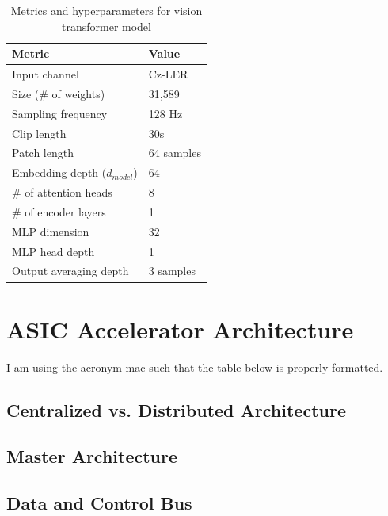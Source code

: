 \documentclass[12pt, hidelinks]{article}
\begin{document}
\begin{table}[ht]
    \centering
    \renewcommand{\arraystretch}{1.2} %
    \setlength{\arrayrulewidth}{1.5pt} %
    \caption{Metrics and hyperparameters for vision transformer model}
    \begin{tabularx}{0.7\textwidth}{@{} *1X *1l @{}}
        \toprule
        Metric                          & Value \\\midrule
        Input channel                   & Cz-LER        \\
        Size (\# of weights)            & 31,589        \\
        Sampling frequency              & 128 Hz        \\
        Clip length                     & 30s           \\
        Patch length                    & 64 samples    \\
        Embedding depth ($d_{model}$)   & 64            \\
        \# of attention heads           & 8             \\
        \# of encoder layers            & 1             \\
        MLP dimension                   & 32            \\
        MLP head depth                  & 1             \\
        Output averaging depth          & 3 samples     \\ \bottomrule 
    \end{tabularx}
    \label{tab:model_param}
\end{table}

\section{ASIC Accelerator Architecture}
\label{sec:arch}
I am using the acronym \ac{mac} such that the table below is properly formatted.
\lipsum[1]
\subsection{Centralized vs. Distributed Architecture}
\subsection{Master Architecture}
\subsection{Data and Control Bus}
\end{document}
